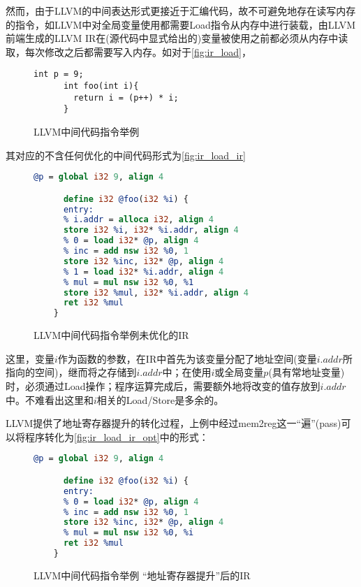 然而，由于LLVM的中间表达形式更接近于汇编代码，故不可避免地存在读写内存的指令，如LLVM中对全局变量使用都需要Load指令从内存中进行装载，由LLVM前端生成的LLVM IR在(源代码中显式给出的)变量被使用之前都必须从内存中读取，每次修改之后都需要写入内存。如对于\autoref{fig:ir_load}，
\begin{figure}[t]
  \begin{center}
    \begin{lstlisting}[language={[ANSI]C}]
      int p = 9;
      int foo(int i){
        return i = (p++) * i;
      }
    \end{lstlisting}
    \vspace{-16pt}
    \caption{LLVM中间代码指令举例}
    \label{fig:ir_load}
  \end{center}
\end{figure}
其对应的不含任何优化的中间代码形式为\autoref{fig:ir_load_ir}
\begin{figure}[t]
  \begin{center}
    \begin{lstlisting}[language=llvm]
      @p = global i32 9, align 4

      define i32 @foo(i32 %i) {
      entry:
      % i.addr = alloca i32, align 4
      store i32 %i, i32* %i.addr, align 4
      % 0 = load i32* @p, align 4
      % inc = add nsw i32 %0, 1
      store i32 %inc, i32* @p, align 4
      % 1 = load i32* %i.addr, align 4
      % mul = mul nsw i32 %0, %1
      store i32 %mul, i32* %i.addr, align 4
      ret i32 %mul
    }
  \end{lstlisting}
  \vspace{-16pt}
  \caption{LLVM中间代码指令举例\cndash 未优化的IR}
  \label{fig:ir_load_ir}
\end{center}
\end{figure}

这里，变量$i$作为函数的参数，在IR中首先为该变量分配了地址空间(变量$i.addr$所指向的空间)，继而将之存储到$i.addr$中；在使用$i$或全局变量$p$(具有常地址变量)时，必须通过Load操作；程序运算完成后，需要额外地将改变的值存放到$i.addr$中。不难看出这里和$i$相关的Load/Store是多余的。

LLVM提供了地址寄存器提升的转化过程，上例中经过mem2reg这一“遍”(pass)可以将程序转化为\autoref{fig:ir_load_ir_opt}中的形式：
\begin{figure}[t]
  \begin{center}
    \begin{lstlisting}[language=llvm]
      @p = global i32 9, align 4

      define i32 @foo(i32 %i) {
      entry:
      % 0 = load i32* @p, align 4
      % inc = add nsw i32 %0, 1
      store i32 %inc, i32* @p, align 4
      % mul = mul nsw i32 %0, %i
      ret i32 %mul
    }
  \end{lstlisting}
  \vspace{-16pt}
  \caption{LLVM中间代码指令举例 \cndash “地址寄存器提升”后的IR}
  \label{fig:ir_load_ir_opt}
\end{center}
\end{figure}


